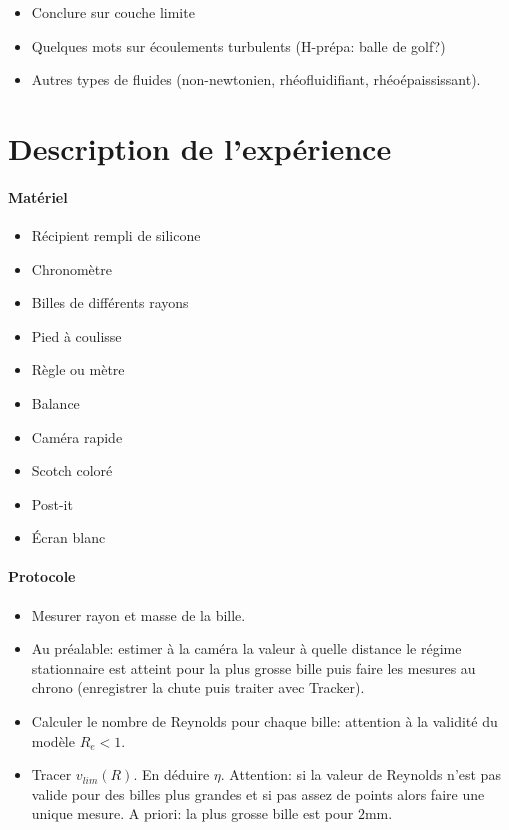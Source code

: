\documentclass[11pt]{report}
\numberwithin{figure}{section}
\numberwithin{equation}{section}
\numberwithin{table}{section}
\newcommand{\1}{\boldsymbol{1}}
\begin{document}
\begin{itemize}
\item Conclure sur couche limite
\item Quelques mots sur écoulements turbulents (H-prépa: balle de golf?)
\item Autres types de fluides (non-newtonien, rhéofluidifiant, rhéoépaississant).
\end{itemize}


\section*{Description de l'expérience}



\begin{tcolorbox}[breakable, enhanced, colback=red!2!white,colframe=mycolor!85!black,title=\textbf{\textbf{Expérience}}]
\paragraph*{Matériel}
\begin{itemize}
\item Récipient rempli de silicone
\item Chronomètre
\item Billes de différents rayons
\item Pied à coulisse
\item Règle ou mètre
\item Balance
\item Caméra rapide
\item Scotch coloré
\item Post-it
\item Écran blanc
\end{itemize}

\paragraph*{Protocole } 

\begin{itemize}[label=$\triangleright$]
\item Mesurer rayon et masse de la bille.
\item Au préalable: estimer à la caméra la valeur à quelle distance le régime stationnaire est atteint pour la plus grosse bille puis faire les mesures au chrono (enregistrer la chute puis traiter avec Tracker).
\item Calculer le nombre de Reynolds pour chaque bille: attention à la validité du modèle $R_e<1$.
\item Tracer $v_{lim}(R)$. En déduire $\eta$. Attention: si la valeur de Reynolds n'est pas valide pour des billes plus grandes et si pas assez de points alors faire une unique mesure. A priori: la plus grosse bille est pour $2$mm.
\end{itemize}


\end{tcolorbox}
\end{document}
